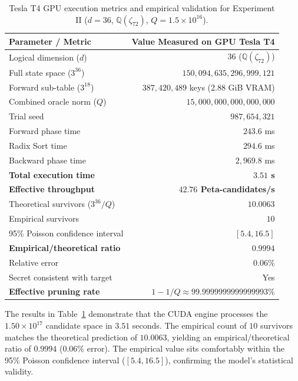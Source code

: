 \documentclass[11pt,a4paper]{article}
\theoremstyle{plain}
\theoremstyle{definition}
\numberwithin{equation}{section}
\newcommand{\QQ}{\mathbb{Q}}
\begin{document}
\begin{table}[htbp]
\centering
\caption{Tesla T4 GPU execution metrics and empirical validation for Experiment II ($d=36$, $\QQ(\zeta_{72})$, $Q = 1.5 \times 10^{16}$).}
\label{tab:exp2_d36}
\begin{tabular}{l r}
\toprule
\textbf{Parameter / Metric} & \textbf{Value Measured on GPU Tesla T4} \\
\midrule
Logical dimension ($d$) & $36$ ($\QQ(\zeta_{72})$) \\
Full state space ($3^{36}$) & $150{,}094{,}635{,}296{,}999{,}121$ \\
Forward sub-table ($3^{18}$) & $387{,}420{,}489$ keys (2.88 GiB VRAM) \\
Combined oracle norm ($Q$) & $15{,}000{,}000{,}000{,}000{,}000$ \\
Trial seed & $987{,}654{,}321$ \\
\midrule
Forward phase time & $243.6$ ms \\
Radix Sort time & $294.6$ ms \\
Backward phase time & $2{,}969.8$ ms \\
\textbf{Total execution time} & \textbf{$3.51$ s} \\
\textbf{Effective throughput} & \textbf{$42.76$ Peta-candidates/s} \\
\midrule
Theoretical survivors ($3^{36}/Q$) & $10.0063$ \\
Empirical survivors & $10$ \\
95\% Poisson confidence interval & $[5.4, 16.5]$ \\
\textbf{Empirical/theoretical ratio} & \textbf{$0.9994$} \\
Relative error & $0.06\%$ \\
Secret consistent with target & Yes \\
\textbf{Effective pruning rate} & \textbf{$1 - 1/Q \approx 99.9999999999999993\%$} \\
\bottomrule
\end{tabular}
\end{table}

The results in Table~\ref{tab:exp2_d36} demonstrate that the CUDA engine processes the $1.50 \times 10^{17}$ candidate space in $3.51$ seconds. The empirical count of $10$ survivors matches the theoretical prediction of $10.0063$, yielding an empirical/theoretical ratio of $0.9994$ ($0.06\%$ error). The empirical value sits comfortably within the 95\% Poisson confidence interval ($[5.4, 16.5]$), confirming the model's statistical validity.
\end{document}
